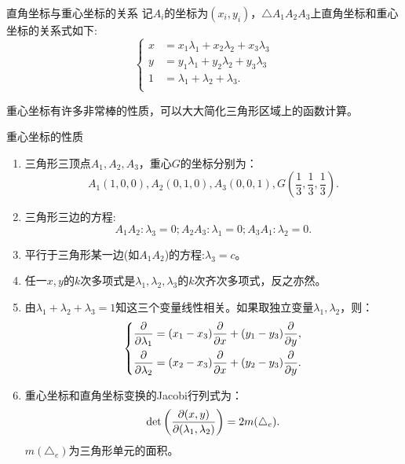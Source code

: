 \begin{proposition}{直角坐标与重心坐标的关系}
   记$A_{i}$的坐标为$(x_{i},y_{i})$，$\triangle A_{1}A_{2}A_{3}$上直角坐标和重心坐标的关系式如下:
   \begin{equation}
    \left\{
        \begin{aligned}
            x&=x_{1}\lambda_{1}+x_{2}\lambda_{2}+x_{3}\lambda_{3}\\
            y&=y_{1}\lambda_{1}+y_{2}\lambda_{2}+y_{3}\lambda_{3}\\
            1&=\lambda_{1}+\lambda_{2}+\lambda_{3}.\\
        \end{aligned}
    \right.
   \end{equation} 
\end{proposition}
重心坐标有许多非常棒的性质，可以大大简化三角形区域上的函数计算。
\begin{proposition}{重心坐标的性质}
    \begin{enumerate}
        \item 三角形三顶点$A_{1},A_{2},A_{3}$，重心$G$的坐标分别为：
        \begin{equation}
            A_{1}(1,0,0), A_{2}(0,1,0), A_{3}(0,0,1), G(\frac{1}{3},\frac{1}{3},\frac{1}{3}).
        \end{equation}
        \item 三角形三边的方程:
        \begin{equation}
            A_{1}A_{2}:\lambda_{3}=0; A_{2}A_{3}:\lambda_{1}=0; A_{3}A_{1}:\lambda_{2}=0.
        \end{equation}
        \item 平行于三角形某一边(如$A_{1}A_{2}$)的方程:$\lambda_{3}=c$。
        \item 任一$x,y$的$k$次多项式是$\lambda_{1},\lambda_{2},\lambda_{3}$的$k$次齐次多项式，反之亦然。
        \item 由$\lambda_{1}+\lambda_{2}+\lambda_{3}=1$知这三个变量线性相关。如果取独立变量$\lambda_{1},\lambda_{2}$，则：
        \begin{equation}
            \left\{
                \begin{aligned}
                    \frac{\partial }{\partial \lambda_{1}}&=(x_{1}-x_3)\frac{\partial }{\partial x}+(y_1-y_3)\frac{\partial }{\partial y},\\
                    \frac{\partial }{\partial \lambda_{2}}&=(x_{2}-x_3)\frac{\partial }{\partial x}+(y_2-y_3)\frac{\partial }{\partial y}.\\
                \end{aligned}
            \right.
        \end{equation}
        \item 重心坐标和直角坐标变换的Jacobi行列式为：
        \begin{equation}
            \det\left(\frac{\partial (x,y)}{\partial (\lambda_{1},\lambda_{2})}\right)=2m(\triangle_{e}).
        \end{equation}
        $m(\triangle_{e})$为三角形单元的面积。
        \end{enumerate}
\end{proposition}
